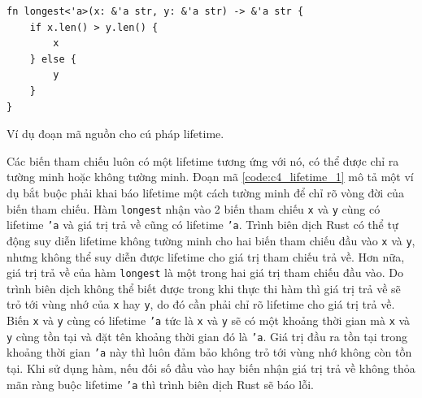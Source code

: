 \begin{listing}[H]
\begin{verbatim}
fn longest<'a>(x: &'a str, y: &'a str) -> &'a str {
    if x.len() > y.len() {
        x
    } else {
        y
    }
}
\end{verbatim}
\caption{Ví dụ đoạn mã nguồn cho cú pháp lifetime.}
\label{code:c4_lifetime_1}
\end{listing}

Các biến tham chiếu luôn có một lifetime tương ứng với nó, có thể được chỉ ra tường minh hoặc không tường minh.
Đoạn mã \ref{code:c4_lifetime_1} mô tả một ví dụ bắt buộc phải khai báo lifetime một cách tường minh để chỉ rõ vòng đời của biến tham chiếu.
Hàm \texttt{longest} nhận vào 2 biến tham chiếu \texttt{x} và \texttt{y} cùng có lifetime \texttt{'a} và giá trị trả về cũng có lifetime \texttt{'a}.
Trình biên dịch Rust có thể tự động suy diễn lifetime không tường minh cho hai biến tham chiếu đầu vào \texttt{x} và \texttt{y}, nhưng không thể suy diễn được lifetime cho giá trị tham chiếu trả về.
Hơn nữa, giá trị trả về của hàm \texttt{longest} là một trong hai giá trị tham chiếu đầu vào.
Do trình biên dịch không thể biết được trong khi thực thi hàm thì giá trị trả về sẽ trỏ tới vùng nhớ của \texttt{x} hay \texttt{y}, do đó cần phải chỉ rõ lifetime cho giá trị trả về.
Biến \texttt{x} và \texttt{y} cùng có lifetime \texttt{'a} tức là \texttt{x} và \texttt{y} sẽ có một khoảng thời gian mà \texttt{x} và \texttt{y} cùng tồn tại và đặt tên khoảng thời gian đó là \texttt{'a}.
Giá trị đầu ra tồn tại trong khoảng thời gian \texttt{'a} này thì luôn đảm bảo không trỏ tới vùng nhớ không còn tồn tại.
Khi sử dụng hàm, nếu đối số đầu vào hay biến nhận giá trị trả về không thỏa mãn ràng buộc lifetime \texttt{'a} thì trình biên dịch Rust sẽ báo lỗi.

\vspace{\baselineskip}

